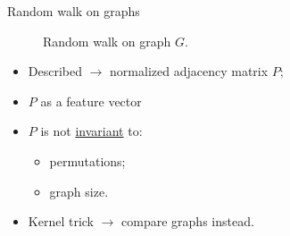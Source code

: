 \documentclass[12pt]{beamer}
\begin{document}
            \begin{frame}{Random walk on graphs}
                \begin{figure}[H]
                    \caption{Random walk on graph \(G\).}
                \end{figure}
                \begin{itemize}[label=\(\blacktriangleright\), font=\color{IGNGreen}]
                    \item<4-> Described \(\longrightarrow\) normalized adjacency matrix \(P\);
                    \item<5-> \(P\) as a feature vector 
                    \item<7-> \(P\) is not \underline{invariant} to:
                    \begin{itemize}[label=-]
                        \item<8-> permutations;
                        \item<9-> graph size.
                    \end{itemize}
                    \item<10-> Kernel trick \(\longrightarrow\) compare graphs instead.
                \end{itemize}
            \end{frame}
\end{document}
